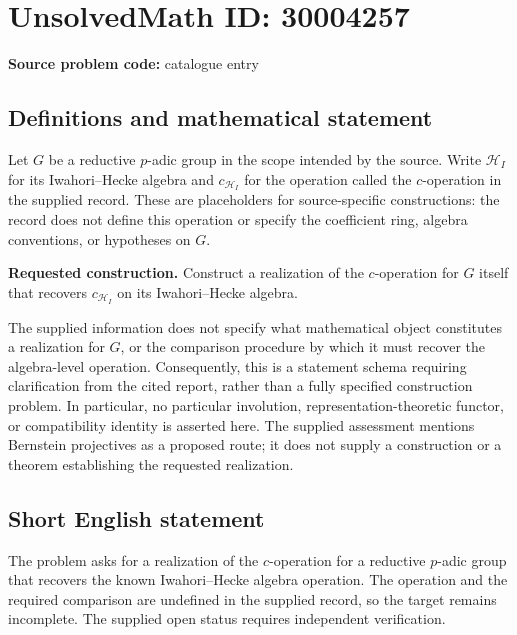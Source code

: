 \documentclass[11pt]{article}
\begin{document}
\section*{UnsolvedMath ID: 30004257}
\textbf{Source problem code:} catalogue entry
\subsection{Definitions and mathematical statement}
Let \(G\) be a reductive \(p\)-adic group in the scope intended by the source. Write \(\mathcal H_I\) for its Iwahori--Hecke algebra and \(c_{\mathcal H_I}\) for the operation called the \(c\)-operation in the supplied record. These are placeholders for source-specific constructions: the record does not define this operation or specify the coefficient ring, algebra conventions, or hypotheses on \(G\).

\textbf{Requested construction.} Construct a realization of the \(c\)-operation for \(G\) itself that recovers \(c_{\mathcal H_I}\) on its Iwahori--Hecke algebra.

The supplied information does not specify what mathematical object constitutes a realization for \(G\), or the comparison procedure by which it must recover the algebra-level operation. Consequently, this is a statement schema requiring clarification from the cited report, rather than a fully specified construction problem. In particular, no particular involution, representation-theoretic functor, or compatibility identity is asserted here. The supplied assessment mentions Bernstein projectives as a proposed route; it does not supply a construction or a theorem establishing the requested realization.
\subsection{Short English statement}
The problem asks for a realization of the \(c\)-operation for a reductive \(p\)-adic group that recovers the known Iwahori--Hecke algebra operation. The operation and the required comparison are undefined in the supplied record, so the target remains incomplete. The supplied open status requires independent verification.
\end{document}
